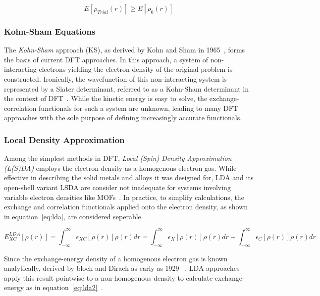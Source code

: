 \documentclass[12pt]{article}
\begin{document}
\begin{equation}
  E[\rho_{Trial}(r)] \geq E[\rho_{0}(r)]
\end{equation}

\subsubsection{Kohn-Sham Equations}

The \textit{Kohn-Sham} approach (KS), as derived by Kohn and Sham in 1965~\cite{Kohn1965}, forms the basis of current DFT approaches. 
In this approach, a system of non-interacting electrons yielding the electron density of the original problem is constructed. 
Ironically, the wavefunction of this non-interacting system is represented by a Slater determinant, referred to as a Kohn-Sham determinant in the context of DFT~.
While the kinetic energy is easy to solve, the exchange-correlation functionals for such a system are unknown, leading to many DFT approaches with the sole purpose of defining increasingly accurate functionals.

\subsubsection{Local Density Approximation}
Among the simplest methods in DFT, \textit{Local (Spin) Density Approximation (L(S)DA)} employs the electron density as a homogenous electron gas.
While effective in describing the solid metals and alloys it was designed for, LDA and its open-shell variant LSDA are consider not inadequate for systems involving variable electron densities like MOFs~\cite{Perdew1981}.
In practice, to simplify calculations, the exchange and correlation functionals applied onto the electron density, as shown in equation~\ref{eq:lda}, are considered seperable.

\begin{equation}
  E_{XC}^{LDA}[\rho(r)] = \int_{-\infty}^{\infty} \epsilon_{XC}[\rho(r)]\rho(r)dr = \int_{-\infty}^{\infty} \epsilon_{X}[\rho(r)]\rho(r)dr + \int_{-\infty}^{\infty} \epsilon_{C}[\rho(r)]\rho(r)dr
  \label{eq:lda}
\end{equation}

\bigskip

\noindent Since the exchange-energy density of a homogenous electron gas is known analytically, derived by bloch and Dirach as early as 1929~\cite{Bloch1929,Dirac1930} , LDA approaches apply this result pointwise to a non-homogenous density to calculate exchange-energy as in equation~\ref{eq:lda2}~\cite{parr1994density}.
\end{document}
